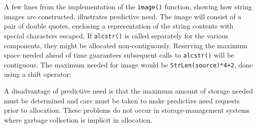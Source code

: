 A few lines from the implementation of the \texttt{image()} function,
showing how string images are constructed, illustrates predictive
need. The image will consist of a pair of double quotes, enclosing a
representation of the string contents with special characters
escaped. If \texttt{alcstr()} is called separately for the various
components, they might be allocated non-contiguously. Reserving the
maximum space needed ahead of time guarantees subsequent calls to
\texttt{alcstr()} will be contiguous. The maximum needed for image
would be \texttt{StrLen(source)*4+2}, done using a shift operator:

\goodbreak
{}

A disadvantage of predictive need is that the maximum amount of
storage needed must be determined and care must be taken to make
predictive need requests prior to allocation. These problems do not
occur in storage-management systems where garbage collection is
implicit in allocation.


